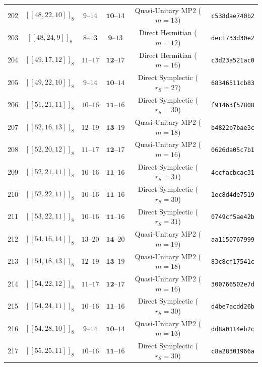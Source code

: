 \documentclass[11pt,a4paper]{article}
\theoremstyle{remark}
\begin{document}
{\begin{longtable}{@{}rccccl@{}}
202 & $[[48,22,10]]_{8}$ & $9\text{--}14$ & $\mathbf{10}\text{--}14$ & Quasi-Unitary MP2 ($m=13$) & \texttt{c538dae740b2} \\
203 & $[[48,24,9]]_{8}$ & $8\text{--}13$ & $\mathbf{9}\text{--}13$ & Direct Hermitian ($m=12$) & \texttt{dec1733d30e2} \\
204 & $[[49,17,12]]_{8}$ & $11\text{--}17$ & $\mathbf{12}\text{--}17$ & Direct Hermitian ($m=16$) & \texttt{c3d23a521ac0} \\
205 & $[[49,22,10]]_{8}$ & $9\text{--}14$ & $\mathbf{10}\text{--}14$ & Direct Symplectic ($r_S=27$) & \texttt{68346511cb83} \\
206 & $[[51,21,11]]_{8}$ & $10\text{--}16$ & $\mathbf{11}\text{--}16$ & Direct Symplectic ($r_S=30$) & \texttt{f91463f57808} \\
207 & $[[52,16,13]]_{8}$ & $12\text{--}19$ & $\mathbf{13}\text{--}19$ & Quasi-Unitary MP2 ($m=18$) & \texttt{b4822b7bae3c} \\
208 & $[[52,20,12]]_{8}$ & $11\text{--}17$ & $\mathbf{12}\text{--}17$ & Quasi-Unitary MP2 ($m=16$) & \texttt{0626da05c7b1} \\
209 & $[[52,21,11]]_{8}$ & $10\text{--}16$ & $\mathbf{11}\text{--}16$ & Direct Symplectic ($r_S=31$) & \texttt{4ccfacbcac31} \\
210 & $[[52,22,11]]_{8}$ & $10\text{--}16$ & $\mathbf{11}\text{--}16$ & Direct Symplectic ($r_S=30$) & \texttt{1ec8d4de7519} \\
211 & $[[53,22,11]]_{8}$ & $10\text{--}16$ & $\mathbf{11}\text{--}16$ & Direct Symplectic ($r_S=31$) & \texttt{0749cf5ae42b} \\
212 & $[[54,16,14]]_{8}$ & $13\text{--}20$ & $\mathbf{14}\text{--}20$ & Quasi-Unitary MP2 ($m=19$) & \texttt{aa1150767999} \\
213 & $[[54,18,13]]_{8}$ & $12\text{--}19$ & $\mathbf{13}\text{--}19$ & Quasi-Unitary MP2 ($m=18$) & \texttt{83c8cf17541c} \\
214 & $[[54,22,12]]_{8}$ & $11\text{--}17$ & $\mathbf{12}\text{--}17$ & Quasi-Unitary MP2 ($m=16$) & \texttt{300766502e7d} \\
215 & $[[54,24,11]]_{8}$ & $10\text{--}16$ & $\mathbf{11}\text{--}16$ & Direct Symplectic ($r_S=30$) & \texttt{d4be7acdd26b} \\
216 & $[[54,28,10]]_{8}$ & $9\text{--}14$ & $\mathbf{10}\text{--}14$ & Quasi-Unitary MP2 ($m=13$) & \texttt{dd8a0114eb2c} \\
217 & $[[55,25,11]]_{8}$ & $10\text{--}16$ & $\mathbf{11}\text{--}16$ & Direct Symplectic ($r_S=30$) & \texttt{c8a28301966a} \\

\end{longtable}}
\end{document}
